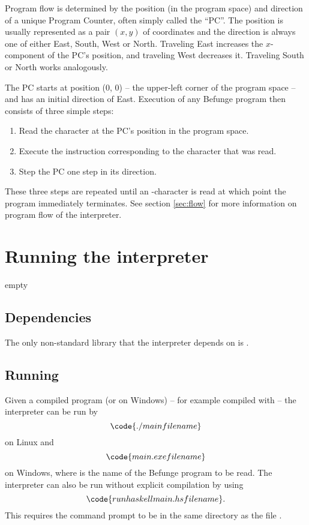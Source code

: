\documentclass[12pt, a4paper]{article}
\begin{document}
Program flow is determined by the position (in the program space) and direction of a unique Program Counter, often simply called the “PC”. The position is usually represented as a pair $(x, y)$ of coordinates and the direction is always one of either East, South, West or North. Traveling East increases the $x$-component of the PC's position, and traveling West decreases it. Traveling South or North works analogously.

The PC starts at position (0, 0) -- the upper-left corner of the program space -- and has an initial direction of East. Execution of any Befunge program then consists of three simple steps:
\begin{enumerate}

\item Read the character at the PC's position in the program space.
\item Execute the instruction corresponding to the character that was read.
\item Step the PC one step in its direction.

\end{enumerate}
These three steps are repeated until an -character is read at which point the program immediately terminates. See section \ref{sec:flow} for more information on program flow of the interpreter.

\section{Running the interpreter}
\label{sec:howtorun}

empty

\subsection{Dependencies}
\label{dependencies}

The only non-standard library that the interpreter depends on is .

\subsection{Running}
\label{sec:run}

Given a compiled program  (or  on Windows) -- for example compiled with  -- the interpreter can be run by
$$\code{./main filename}$$
on Linux and
$$\code{main.exe filename}$$
on Windows, where  is the name of the Befunge program to be read. The interpreter can also be run without explicit compilation by using
$$\code{runhaskell main.hs filename}.$$
This requires the command prompt to be in the same directory as the file .
\end{document}
